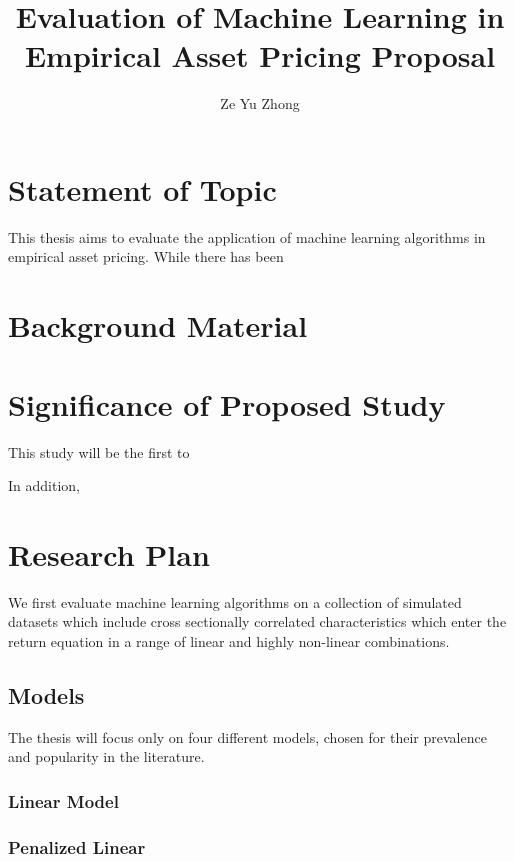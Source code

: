 \documentclass[a4paper]{article}
\title{Evaluation of Machine Learning in Empirical Asset Pricing Proposal}
\author{Ze Yu Zhong}
\begin{document}
\maketitle


\section{Statement of Topic}

This thesis aims to evaluate the application of machine learning algorithms in empirical asset pricing. While there has been 

\section{Background Material}


\section{Significance of Proposed Study}

This study will be the first to 

In addition, 

\section{Research Plan}

We first evaluate machine learning algorithms on a collection of simulated datasets which include cross sectionally correlated characteristics which enter the return equation in a range of linear and highly non-linear combinations.

\subsection{Models}

The thesis will focus only on four different models, chosen for their prevalence and popularity in the literature.

\subsubsection{Linear Model}

\subsubsection{Penalized Linear}
\end{document}
